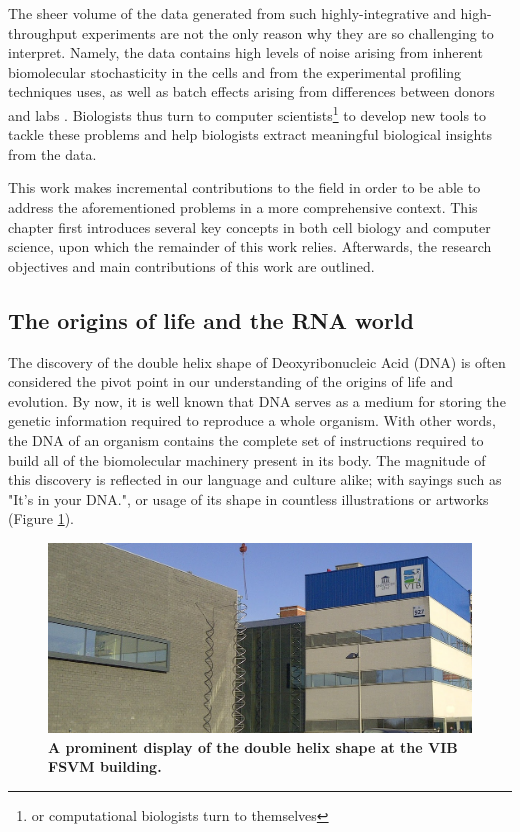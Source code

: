 The sheer volume of the data generated from such highly-integrative and high-throughput experiments are not the only reason why they are so challenging to interpret. 
Namely, the data contains high levels of noise arising from inherent biomolecular stochasticity in the cells and from the experimental profiling techniques uses, as well as batch effects arising from differences between donors and labs \cite{hon_humancellatlas_2018}. Biologists thus turn to computer scientists\footnote{or computational biologists turn to themselves} to develop new tools to tackle these problems and help biologists extract meaningful biological insights from the data.

This work makes incremental contributions to the field in order to be able to address the aforementioned problems in a more comprehensive context. This chapter first introduces several key concepts in both cell biology and computer science, upon which the remainder of this work relies. Afterwards, the research objectives and main contributions of this work are outlined.

\subsection{The origins of life and the RNA world}
The discovery of the double helix shape of Deoxyribonucleic Acid (DNA) \cite{watson_molecularstructurenucleic_1953} is often considered the pivot point in our understanding of the origins of life and evolution. By now, it is well known that DNA serves as a medium for storing the genetic information required to reproduce a whole organism. With other words, the DNA of an organism contains the complete set of instructions required to build all of the biomolecular machinery present in its body.
The magnitude of this discovery is reflected in our language and culture alike; with sayings such as "It's in your DNA.", or usage of its shape in countless illustrations or artworks (Figure \ref{fig:fsvm}).


\begin{figure}[htb!]
	\centering\includegraphics[width=.5\linewidth]{fig/fsvm3} %
	\caption{
		\textbf{A prominent display of the double helix shape at the VIB FSVM building.}
	}
	\label{fig:fsvm}
\end{figure}

